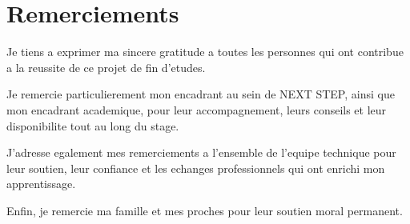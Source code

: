 ﻿\chapter*{Remerciements}

Je tiens a exprimer ma sincere gratitude a toutes les personnes qui ont contribue a la reussite de ce projet de fin d'etudes.

Je remercie particulierement mon encadrant au sein de NEXT STEP, ainsi que mon encadrant academique, pour leur accompagnement, leurs conseils et leur disponibilite tout au long du stage.

J'adresse egalement mes remerciements a l'ensemble de l'equipe technique pour leur soutien, leur confiance et les echanges professionnels qui ont enrichi mon apprentissage.

Enfin, je remercie ma famille et mes proches pour leur soutien moral permanent.
